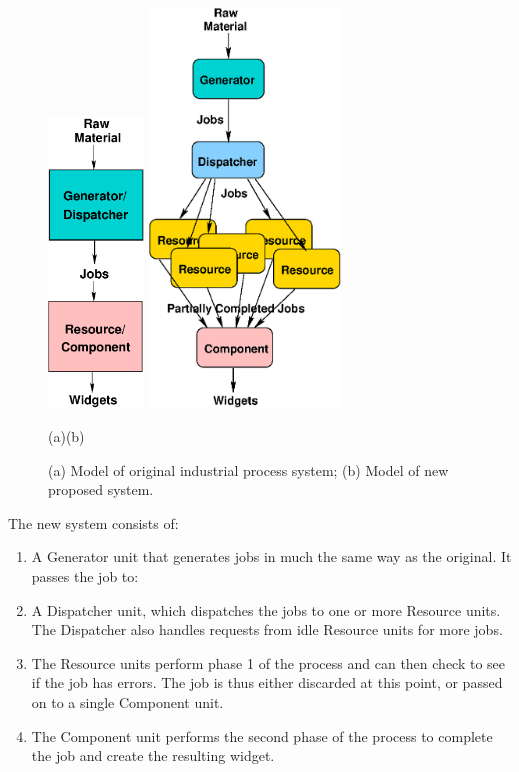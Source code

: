 \documentclass[10pt]{article}
\begin{document}
\begin{figure}[ht]
\begin{center}
\includegraphics[width=1in]{oldsys}
\hskip1in
\includegraphics[width=2in]{newsys}\\
\end{center}
\hskip1.7in(a)\hskip2.2in(b)\\
\caption{(a) Model of original industrial process system; (b) Model of
new proposed system.}
\label{fig:ipsys}
\end{figure}

The new system consists of:

\begin{enumerate}
\item A Generator unit that generates jobs in much the
same way as the original.  It passes the job to:
\item A Dispatcher unit, which dispatches the jobs to one or more
Resource units.  The Dispatcher also handles requests from idle
Resource units for more jobs.  
\item The Resource units perform phase 1 of the process and can then
check to see if the job has errors.  The job is thus either discarded
at this point, or passed on to a single Component unit.
\item The Component unit performs the second phase of the process to
complete the job and create the resulting widget.
\end{enumerate}
\end{document}
